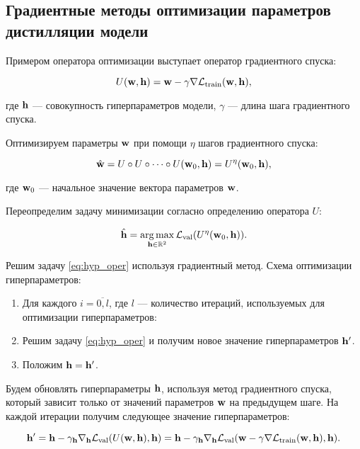 \documentclass[12pt, twoside]{article}
\begin{document}
\subsection{Градиентные методы оптимизации параметров дистилляции модели}

Примером оператора оптимизации выступает оператор градиентного спуска:

\begin{equation} \label{eq:operator}
    U(\bw, \bh) = \bw - \gamma\nabla\cL_\text{train}(\bw, \bh),
\end{equation}

\noindent
где $\mathbf{h}$ --- совокупность гиперпараметров модели, $\gamma$ — длина шага градиентного спуска.

Оптимизируем параметры $\mathbf{w}$ при помощи $\eta$ шагов градиентного спуска:

\begin{equation} \label{eq:oper_superp}
    \hat{\bw} = U \circ U \circ \dots \circ U(\bw_0, \bh) = U^\eta(\bw_0, \bh),
\end{equation}

\noindent
где $\mathbf{w}_0$ --- начальное значение вектора параметров $\mathbf{w}$.

Переопределим задачу минимизации согласно определению оператора $U$:

\begin{equation} \label{eq:hyp_oper}
    \hat{\bh} = \argmax\limits_{\bh \in \bbR^2} \cL_\text{val}(U^\eta(\bw_0, \bh)).
\end{equation}

Решим задачу \eqref{eq:hyp_oper} используя градиентный метод. Схема оптимизации гиперпараметров:

\begin{enumerate}
    \item Для каждого $i = \overline{0, l}$, где $l$ --- количество итераций, используемых для оптимизации гиперпараметров:
    \item Решим задачу \eqref{eq:hyp_oper} и получим новое значение гиперпараметров $\mathbf{h}^\prime$.
    \item Положим $\mathbf{h} = \mathbf{h}^\prime$.
\end{enumerate}

Будем обновлять гиперпараметры $\mathbf{h}$, используя метод градиентного спуска, который зависит только от значений параметров $\mathbf{w}$ на предыдущем шаге. На каждой итерации получим следующее значение гиперпараметров:

\begin{equation} \label{eq:hyp_alg}
    \bh^\prime = \bh - \gamma_{\bh}\nabla_{\bh}\cL_\text{val}(U(\bw, \bh), \bh) = \bh - \gamma_{\bh}\nabla_{\bh}\cL_\text{val}(\bw - \gamma\nabla\cL_\text{train}(\bw, \bh), \bh).
\end{equation}
\end{document}
